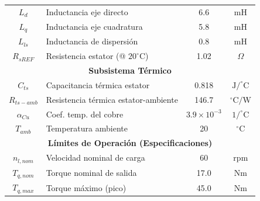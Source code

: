 \documentclass[12pt, a4paper,journal, onecolumn, compsoc]{IEEEtran}
\begin{document}
\begin{table}[htbp]
\begin{tabular}{|c|l|c|c|}
        $L_d$ & Inductancia eje directo & 6.6 & mH \\
        $L_q$ & Inductancia eje cuadratura & 5.8 & mH \\
        $L_{ls}$ & Inductancia de dispersión & 0.8 & mH \\
        $R_{sREF}$ & Resistencia estator (@ $20^\circ$C) & 1.02 & $\Omega$ \\
        \hline
        \multicolumn{4}{|c|}{\textbf{Subsistema Térmico}} \\
        \hline
        $C_{ts}$ & Capacitancia térmica estator & 0.818 & $\text{J}/^\circ\text{C}$ \\
        $R_{ts-amb}$ & Resistencia térmica estator-ambiente & 146.7 & $^\circ\text{C}/\text{W}$ \\
        $\alpha_{Cu}$ & Coef. temp. del cobre & $3.9 \times 10^{-3}$ & $1/^\circ\text{C}$ \\
        $T_{amb}$ & Temperatura ambiente & 20 & $^\circ\text{C}$ \\
        \hline
        \multicolumn{4}{|c|}{\textbf{Límites de Operación (Especificaciones)}} \\
        \hline
        $n_{l,nom}$ & Velocidad nominal de carga & 60 & rpm \\
        $T_{q,nom}$ & Torque nominal de salida & 17.0 & Nm \\
        $T_{q,max}$ & Torque máximo (pico) & 45.0 & Nm \\
        \hline
    \end{tabular}
    \label{tab:parametros}
\end{table}
\end{document}

